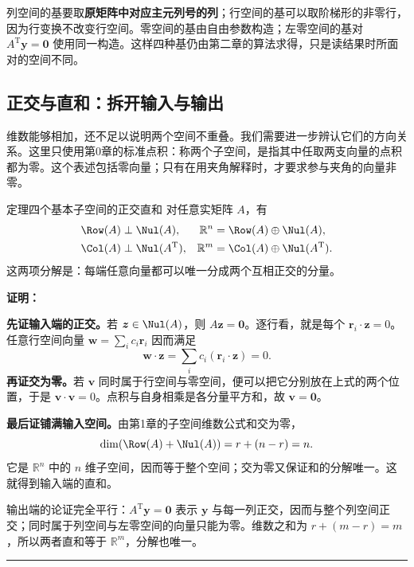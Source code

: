 \documentclass[a4paper,12pt,twoside,openany,fontset=none]{ctexbook}
\let\oldsum\sum
\renewcommand{\sum}{\displaystyle\oldsum}
\newcounter{theorem}[chapter]
\newenvironment{theorem}[1][]{\begin{thmBox}{定理}{#1}}{\end{thmBox}}
\renewenvironment{proof}{
    \par\vspace{0.5em}\noindent
    \textbf{\color{LogicColor} 证明：}
}{
    \hfill \textcolor{LogicColor}{\rule{0.6em}{0.6em}} \par
}
\numberwithin{equation}{chapter}
\begin{document}
列空间的基要取\textbf{原矩阵中对应主元列号的列}；行空间的基可以取阶梯形的非零行，因为行变换不改变行空间。零空间的基由自由参数构造；左零空间的基对 $A^{\mathrm T}\boldsymbol y=\boldsymbol0$ 使用同一构造。这样四种基仍由第二章的算法求得，只是读结果时所面对的空间不同。

\subsection{正交与直和：拆开输入与输出}

维数能够相加，还不足以说明两个空间不重叠。我们需要进一步辨认它们的方向关系。这里只使用第0章的标准点积：称两个子空间，是指其中任取两支向量的点积都为零。这个表述包括零向量；只有在用夹角解释时，才要求参与夹角的向量非零。

\begin{theorem}[四个基本子空间的正交直和]
对任意实矩阵 $A$，有
\begin{align}
 \Row(A)&\perp\Nul(A),&
 \mathbb R^n&=\Row(A)\oplus\Nul(A),\\
 \Col(A)&\perp\Nul(A^{\mathrm T}),&
 \mathbb R^m&=\Col(A)\oplus\Nul(A^{\mathrm T}).
 \label{eq:five-orthogonal-sums}
\end{align}
这两项分解是：每端任意向量都可以唯一分成两个互相正交的分量。
\end{theorem}
\begin{proof}
\textbf{先证输入端的正交。}若 $\boldsymbol z\in\Nul(A)$，则 $A\boldsymbol z=\boldsymbol0$。逐行看，就是每个 $\boldsymbol r_i\cdot\boldsymbol z=0$。任意行空间向量 $\boldsymbol w=\sum_i c_i\boldsymbol r_i$ 因而满足
\begin{equation}
 \boldsymbol w\cdot\boldsymbol z=\sum_i c_i(\boldsymbol r_i\cdot\boldsymbol z)=0.
\end{equation}
\textbf{再证交为零。}若 $\boldsymbol v$ 同时属于行空间与零空间，便可以把它分别放在上式的两个位置，于是 $\boldsymbol v\cdot\boldsymbol v=0$。点积与自身相乘是各分量平方和，故 $\boldsymbol v=\boldsymbol0$。

\textbf{最后证铺满输入空间。}由第1章的子空间维数公式和交为零，
\begin{equation}
 \dim(\Row(A)+\Nul(A))=r+(n-r)=n.
\end{equation}
它是 $\mathbb R^n$ 中的 $n$ 维子空间，因而等于整个空间；交为零又保证和的分解唯一。这就得到输入端的直和。

输出端的论证完全平行：$A^{\mathrm T}\boldsymbol y=\boldsymbol0$ 表示 $\boldsymbol y$ 与每一列正交，因而与整个列空间正交；同时属于列空间与左零空间的向量只能为零。维数之和为 $r+(m-r)=m$，所以两者直和等于 $\mathbb R^m$，分解也唯一。
\end{proof}
\end{document}
